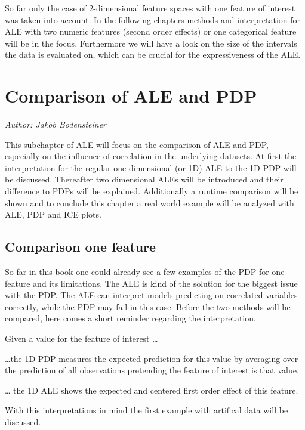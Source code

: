 \documentclass[
]{krantz}
\begin{document}
So far only the case of 2-dimensional feature spaces with one feature of interest was taken into account. In the following chapters methods and interpretation for ALE with two numeric features (second order effects) or one categorical feature will be in the focus. Furthermore we will have a look on the size of the intervals the data is evaluated on, which can be crucial for the expressiveness of the ALE.

\hypertarget{comparison-of-ale-and-pdp}{%
\chapter{Comparison of ALE and PDP}\label{comparison-of-ale-and-pdp}}

\emph{Author: Jakob Bodensteiner}

This subchapter of ALE will focus on the comparison of ALE and PDP, especially on the influence of correlation in the underlying datasets. At first the interpretation for the regular one dimensional (or 1D) ALE to the 1D PDP will be discussed. Thereafter two dimensional ALEs will be introduced and their difference to PDPs will be explained. Additionally a runtime comparison will be shown and to conclude this chapter a real world example will be analyzed with ALE, PDP and ICE plots.

\hypertarget{comparison-one-feature}{%
\section{Comparison one feature}\label{comparison-one-feature}}

So far in this book one could already see a few examples of the PDP for one feature and its limitations. The ALE is kind of the solution for the biggest issue with the PDP. The ALE can interpret models predicting on correlated variables correctly, while the PDP may fail in this case. Before the two methods will be compared, here comes a short reminder regarding the interpretation.

Given a value for the feature of interest \ldots{}

\ldots the 1D PDP measures the expected prediction for this value by averaging over the prediction of all observations pretending the feature of interest is that value.

\ldots{} the 1D ALE shows the expected and centered first order effect of this feature.

With this interpretations in mind the first example with artifical data will be discussed.
\end{document}
